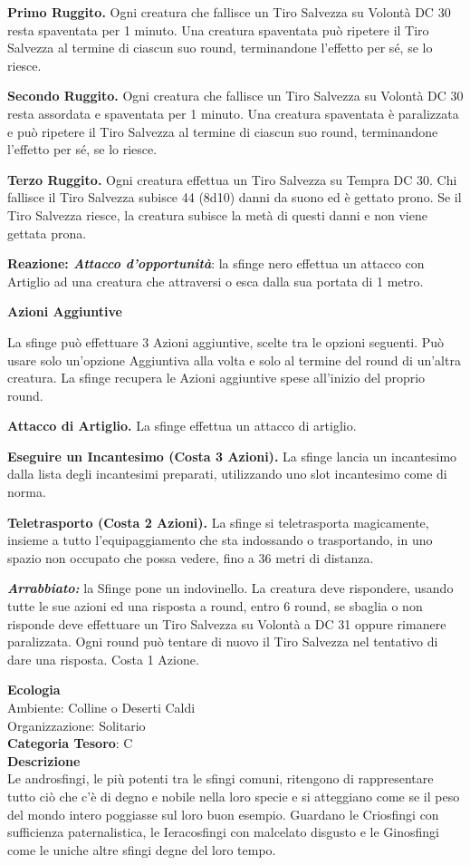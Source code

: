 \begin{multicols}{2}
{\textbf{Primo Ruggito.} Ogni creatura che fallisce un Tiro Salvezza su Volontà DC 30 resta spaventata per 1 minuto. Una creatura spaventata può ripetere il Tiro Salvezza al termine di ciascun suo round, terminandone l'effetto per sé, se lo riesce.

\textbf{Secondo Ruggito.} Ogni creatura che fallisce un Tiro Salvezza su Volontà DC 30 resta assordata e spaventata per 1 minuto. Una creatura spaventata è paralizzata e può ripetere il Tiro Salvezza al termine di ciascun suo round, terminandone l'effetto per sé, se lo riesce.

\textbf{Terzo Ruggito.} Ogni creatura effettua un Tiro Salvezza su Tempra DC 30. Chi fallisce il Tiro Salvezza subisce 44 (8d10) danni da suono ed è gettato prono. Se il Tiro Salvezza riesce, la creatura subisce la metà di questi danni e non viene gettata prona.

\textbf{Reazione: \emph{Attacco d'opportunità}}: la sfinge nero effettua un attacco con Artiglio ad una creatura che attraversi o esca dalla sua portata di 1 metro.

\textbf{Azioni Aggiuntive}

La sfinge può effettuare 3 Azioni aggiuntive, scelte tra le opzioni seguenti. Può usare solo un'opzione Aggiuntiva alla volta e solo al termine del round di un'altra creatura. La sfinge recupera le Azioni aggiuntive spese all'inizio del proprio round.

\textbf{Attacco di Artiglio.} La sfinge effettua un attacco di artiglio.

\textbf{Eseguire un Incantesimo (Costa 3 Azioni).} La sfinge lancia un incantesimo dalla lista degli incantesimi preparati, utilizzando uno slot incantesimo come di norma.

\textbf{Teletrasporto (Costa 2 Azioni).} La sfinge si teletrasporta magicamente, insieme a tutto l'equipaggiamento che sta indossando o trasportando, in uno spazio non occupato che possa vedere, fino a 36 metri di distanza.

\emph{\textbf{Arrabbiato:}} la Sfinge pone un indovinello. La creatura deve rispondere, usando tutte le sue azioni ed una risposta a round, entro 6 round, se sbaglia o non risponde deve effettuare un Tiro Salvezza su Volontà a DC 31 oppure rimanere paralizzata. Ogni round può tentare di nuovo il Tiro Salvezza nel tentativo di dare una risposta. Costa 1 Azione.

\textbf{Ecologia}\\
Ambiente: Colline o Deserti Caldi\\
Organizzazione: Solitario\\
\textbf{Categoria Tesoro}: C\\
\textbf{Descrizione}\\
Le androsfingi, le più potenti tra le sfingi comuni, ritengono di rappresentare tutto ciò che c'è di degno e nobile nella loro specie e si atteggiano come se il peso del mondo intero poggiasse sul loro buon esempio. Guardano le Criosfingi con sufficienza paternalistica, le Ieracosfingi con malcelato disgusto e le Ginosfingi come le uniche altre sfingi degne del loro tempo.

}
\end{multicols}
